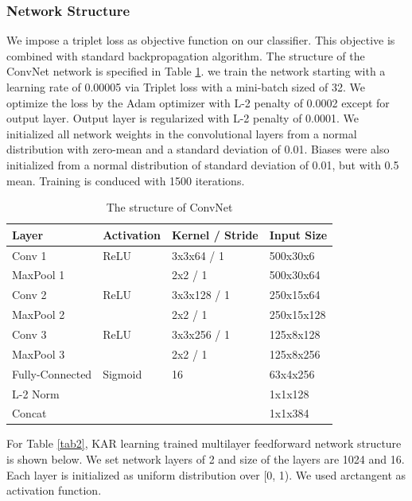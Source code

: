 \documentclass[runningheads]{llncs}
\begin{document}
\subsubsection{Network Structure}
 We impose a triplet loss as objective function on our classifier. This objective is combined with standard backpropagation algorithm.
 The structure of the ConvNet network is specified in Table \ref{tab1}. we train the network starting with a learning rate of 0.00005 via Triplet loss with a mini-batch sized of 32. We optimize the loss by the Adam optimizer with L-2 penalty of 0.0002 except for output layer. Output layer is regularized with L-2 penalty of 0.0001.
 We initialized all network weights in the convolutional layers from a normal distribution with zero-mean and a standard deviation of 0.01. Biases were also initialized from a normal distribution of standard deviation of 0.01, but with 0.5 mean.
 Training is conduced with 1500 iterations.
 
 \begin{table}[]
    \caption{The structure of ConvNet}\label{tab1}
    \centering
    \begin{tabular}{|l|l|l|l|}
    \hline
    Layer     & Activation & Kernel / Stride & Input Size \\ \hline
    Conv 1    & ReLU       & 3x3x64 / 1      & 500x30x6   \\
    MaxPool 1 &            & 2x2 / 1         & 500x30x64  \\
    Conv 2    & ReLU       & 3x3x128 / 1     & 250x15x64 \\
    MaxPool 2 &            & 2x2 / 1         & 250x15x128 \\
    Conv 3    & ReLU       & 3x3x256 / 1     & 125x8x128  \\
    MaxPool 3 &            & 2x2 / 1         & 125x8x256  \\
    Fully-Connected     & Sigmoid    & 16             & 63x4x256   \\
    L-2 Norm  &            &                 & 1x1x128    \\
    Concat    &            &                 & 1x1x384    \\ \hline
    \end{tabular}
\end{table}

For Table \ref{tab2}, KAR learning trained multilayer feedforward network structure is shown below. We set network layers of 2 and size of the layers are 1024 and 16. Each layer is initialized as uniform distribution over [0, 1). We used arctangent as activation function.
\end{document}
